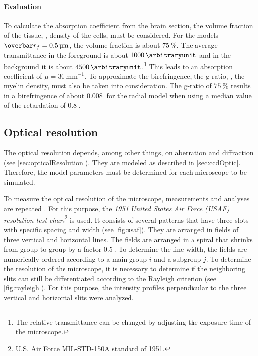 \paragraph{Evaluation}
To calculate the absorption coefficient from the brain section, the volume fraction of the tissue, \ie{}, density of the cells, must be considered.
For the models $\fiberRadiusMean = \SI{0.5}{\micro\meter}$, the volume fraction is about $\SI{75}{\percent}$.
The average transmittance in the foreground is about $\SI{1000}{\arbitraryunit}$ and in the background it is about $\SI{4500}{\arbitraryunit}$.\footnote{The relative transmittance can be changed by adjusting the exposure time of the microscope.}
This leads to an absorption coefficient of $\mu = \SI{30}{\milli\meter\tothe{-1}}$.
To approximate the birefringence, the g-ratio, \ie{}, the myelin density, must also be taken into consideration.
The g-ratio of $\SI{75}{\percent}$ results in a birefringence of about $\SI{0.008}{}$ for the radial model when using a median value of the retardation of $\SI{0.8}{}$.
%
%
%
\subsection{Optical resolution}
%
The optical resolution depends, among other things, on aberration and diffraction (see \cref{sec:opticalResolution}).
They are modeled as described in \cref{sec:ccdOptic}.
Therefore, the model parameters must be determined for each microscope to be simulated.
\par
%
To measure the optical resolution of the microscope, measurements and analyses are repeated \cite{MenzelMaster}.
For this purpose, the \textit{1951 United States Air Force (USAF) resolution test chart}\footnote{U.S. Air Force MIL-STD-150A standard of 1951.} is used.
It consists of several patterns that have three slots with specific spacing and width (see \cref{fig:usaf}).
They are arranged in fields of three vertical and horizontal lines.
The fields are arranged in a spiral that shrinks from group to group by a factor $\SI{0.5}{}$.
To determine the line width, the fields are numerically ordered according to a main group $i$ and a subgroup $j$.
To determine the resolution of the microscope, it is necessary to determine if the neighboring slits can still be differentiated according to the Rayleigh criterion (see \cref{fig:rayleigh}).
For this purpose, the intensity profiles perpendicular to the three vertical and horizontal slits were analyzed.
%
%
%

